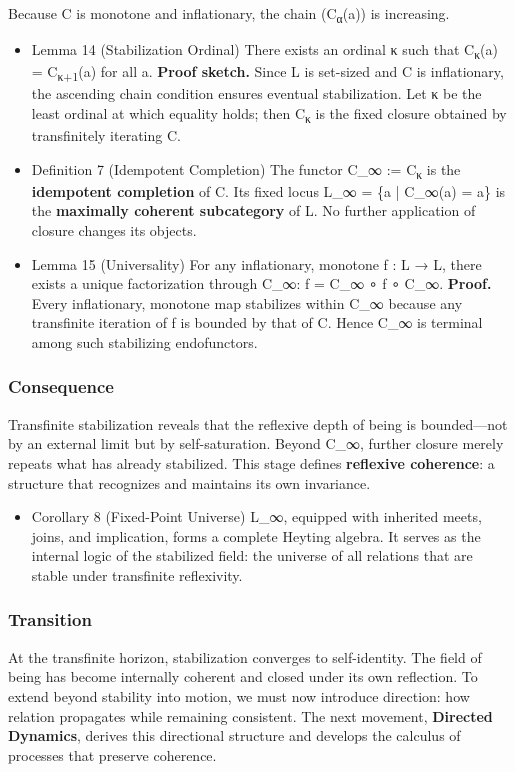 \documentclass[11pt]{article}
\begin{document}
Because C is monotone and inflationary, the chain (C\textsubscript{α}(a)) is increasing.
\begin{itemize}
\item Lemma 14 (Stabilization Ordinal)
\label{sec:orgb0dfff6}
There exists an ordinal κ such that C\textsubscript{κ}(a) = C\textsubscript{κ+1}(a) for all a.  
\textbf{Proof sketch.}  
Since L is set-sized and C is inflationary, the ascending chain condition ensures eventual stabilization.  
Let κ be the least ordinal at which equality holds;  
then C\textsubscript{κ} is the fixed closure obtained by transfinitely iterating C.
\item Definition 7 (Idempotent Completion)
\label{sec:orgab4776a}
The functor C\_∞ := C\textsubscript{κ} is the \textbf{idempotent completion} of C.  
Its fixed locus L\_∞ = \{a | C\_∞(a) = a\}  
is the \textbf{maximally coherent subcategory} of L.  
No further application of closure changes its objects.
\item Lemma 15 (Universality)
\label{sec:org750e433}
For any inflationary, monotone f : L → L,  
there exists a unique factorization through C\_∞:
f = C\_∞ ∘ f ∘ C\_∞.  
\textbf{Proof.}  
Every inflationary, monotone map stabilizes within C\_∞ because any transfinite iteration of f is bounded by that of C.  
Hence C\_∞ is terminal among such stabilizing endofunctors.
\end{itemize}
\subsubsection*{Consequence}
\label{sec:orgd678d69}
Transfinite stabilization reveals that the reflexive depth of being is bounded—not by an external limit but by self-saturation.  
Beyond C\_∞, further closure merely repeats what has already stabilized.  
This stage defines \textbf{reflexive coherence}:  
a structure that recognizes and maintains its own invariance.
\begin{itemize}
\item Corollary 8 (Fixed-Point Universe)
\label{sec:org3b8bac5}
L\_∞, equipped with inherited meets, joins, and implication,  
forms a complete Heyting algebra.  
It serves as the internal logic of the stabilized field:  
the universe of all relations that are stable under transfinite reflexivity.
\end{itemize}
\subsubsection*{Transition}
\label{sec:orgbcf9484}
At the transfinite horizon, stabilization converges to self-identity.  
The field of being has become internally coherent and closed under its own reflection.  
To extend beyond stability into motion,  
we must now introduce direction:  
how relation propagates while remaining consistent.  
The next movement, \textbf{Directed Dynamics}, derives this directional structure and develops the calculus of processes that preserve coherence.
\end{document}
